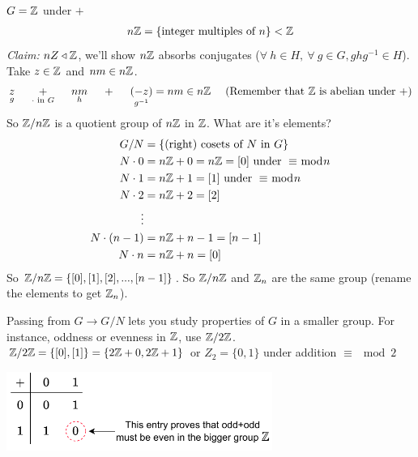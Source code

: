 \begin{example}
$G={\mathbb{ Z}}$ under $+$
\begin{align}
    n{\mathbb{ Z}}=\{\text{integer multiples of }n\}< {\mathbb{ Z}} \nonumber
\end{align}
\textit{Claim:} $nZ\triangleleft {\mathbb{ Z}}$, we'll show $n{\mathbb{ Z}}$ absorbs conjugates ($\forall \ h\in H, \ \forall \ g\in G, ghg^{-1}\in H$).\\
Take $z\in {\mathbb{ Z}}$ and $nm\in n{\mathbb{ Z}}$.
\begin{align}
    \underset{g}{z}\ \ \ \ \underset{\cdot \text{ in } G}{+}\ \ \ \ \underset{h}{nm}\ \ \ \ +\ \ \ \ \underset{g^{-1}}{(-z)}=nm \in n\Z \ \ \ \ (\text{Remember that }\Z\text{ is abelian under }+) \nonumber
\end{align}
So ${\mathbb{ Z}}/n{\mathbb{ Z}}$ is a quotient group of $n{\mathbb{ Z}}$ in ${\mathbb{ Z}}$. What are it's elements?
\begin{align}
    G/N&= \{\text{(right) cosets of }N \text{ in }G\}\nonumber \\
    N\cdot 0 &= n{\mathbb{ Z}}+0 = n{\mathbb{ Z}}=[0] \text{ under }\equiv\bmod n \nonumber \\
    N\cdot 1 &= n{\mathbb{ Z}}+1 =[1] \text{ under }\equiv\bmod n \nonumber \\
    N\cdot 2 &= n{\mathbb{ Z}}+2 =[2] \nonumber\\
    \vdots \nonumber \\
    N\cdot (n-1)&= n{\mathbb{ Z}}+n-1=[n-1] \nonumber \\
    N\cdot n&= n{\mathbb{ Z}}+n=[0] \nonumber 
\end{align}
So ${\mathbb{ Z}}/n{\mathbb{ Z}}= \{[0],[1],[2],...,[n-1]\}$. So ${\mathbb{ Z}}/n{\mathbb{ Z}}$ and ${\mathbb{ Z}}_n$ are the same group (rename the elements to get ${\mathbb{ Z}}_n$).
\end{example}

\begin{example}
Passing from $G\rightarrow G/N$ lets you study properties of $G$ in a smaller group. For instance, oddness or evenness in ${\mathbb{ Z}}$, use ${\mathbb{ Z}}/2{\mathbb{ Z}}$.\steezybreak\\
${\mathbb{ Z}}/2{\mathbb{ Z}}=\{[0],[1]\}=\{2{\mathbb{ Z}}+0,2{\mathbb{ Z}}+1\}$ or $Z_2=\{0,1\}$ under addition $\equiv\mod 2$

    \includegraphics[width=0.65\textwidth]{Figures/Z2-cayley-example-later (1).pdf}

\end{example}

